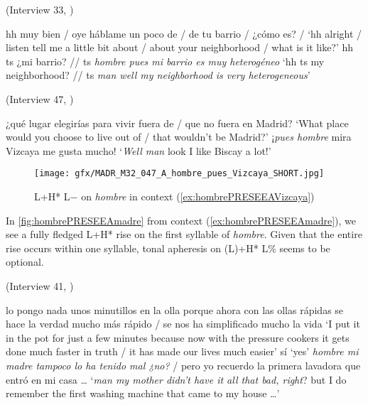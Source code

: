 \begin{exe}
	\ex (Interview 33, \cite{PRESEEA.20142020})\label{ex:hombrePRESEEAheterogeneo}
	\begin{xlist}[A:]
		  hh muy bien / oye háblame un poco de / de tu barrio / ¿cómo es? / 
		\glt `hh alright / listen tell me a little bit about / about your neighborhood / what is it like?'
		 hh ts ¿mi barrio? // ts \textit{hombre pues mi barrio es muy heterogéneo}  
		\glt `hh ts my neighborhood? // ts \textit{man well my neighborhood is very heterogeneous}'
	\end{xlist}

	\ex (Interview 47, \cite{PRESEEA.20142020})\label{ex:hombrePRESEEAVizcaya}
	\begin{xlist}[A:]\sloppy
	  ¿qué lugar elegirías para vivir fuera de / que no fuera en Madrid? 
	\glt `What place would you choose to live out of / that wouldn't be Madrid?'
	 ¡\textit{pues hombre} mira Vizcaya me gusta mucho!
	\glt `\textit{Well man} look I like Biscay a lot!'
	\end{xlist}
\end{exe}

\begin{figure}
	\texttt{[image: gfx/MADR\_M32\_047\_A\_hombre\_pues\_Vizcaya\_SHORT.jpg]}
	\caption[L+H* L$-$ on \textit{hombre} in context (\ref{ex:hombrePRESEEAVizcaya})]{L+H* L$-$ on \textit{hombre} in context (\ref{ex:hombrePRESEEAVizcaya}) \href{https://osf.io/d368j/}{\faVolumeUp} \label{fig:hombrePRESEEAVizcaya}}
\end{figure}

In \autoref{fig:hombrePRESEEAmadre} from context (\ref{ex:hombrePRESEEAmadre}), we see a fully fledged L+H* rise on the first syllable of \textit{hombre}. Given that the entire rise occurs within one syllable, tonal apheresis on (L)+H* L\% seems to be optional.\largerpage

\begin{exe}
	\ex (Interview 41, \cite{PRESEEA.20142020}) \label{ex:hombrePRESEEAmadre}
	\begin{xlist}[A:]
	  lo pongo nada unos minutillos en la olla porque ahora con las ollas rápidas se hace la verdad mucho más rápido / se nos ha simplificado mucho la vida 
	\pagebreak
	\glt `I put it in the pot for just a few minutes because now with the pressure cookers it gets done much faster in truth / it has made our lives much easier'
	  sí 
	\glt `yes'
	  \textit{hombre mi madre tampoco lo ha tenido mal ¿no?} / pero yo recuerdo la primera lavadora que entró en mi casa \ldots 
	\glt `\textit{man my mother didn't have it all that bad, right}? but I do remember the first washing machine that came to my house \ldots'
	\end{xlist}
\end{exe}

